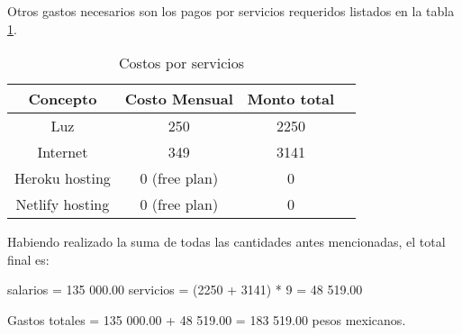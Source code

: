 Otros gastos necesarios son los pagos por servicios requeridos listados en la tabla \ref{tab:services_costs}.

\begin{table}
    \centering
    \begin{tabular}{|c|c|c|c|}
    \hline
        Concepto & Costo Mensual & Monto total \\ \hline
        Luz & 250 & 2250  \\ \hline
        Internet & 349 & 3141 \\ \hline
        Heroku hosting & 0 (free plan) & 0 \\ \hline
        Netlify hosting & 0 (free plan) & 0 \\ \hline
    \end{tabular}
    \caption{Costos por servicios}
    \label{tab:services_costs}
\end{table}

Habiendo realizado la suma de todas las cantidades antes mencionadas, el total final es:

\begin{center}

	salarios = 135 000.00
	servicios = (2250 + 3141) * 9 = 48 519.00

	Gastos totales = 135 000.00 + 48 519.00 = 183 519.00 pesos mexicanos.

\end{center}

